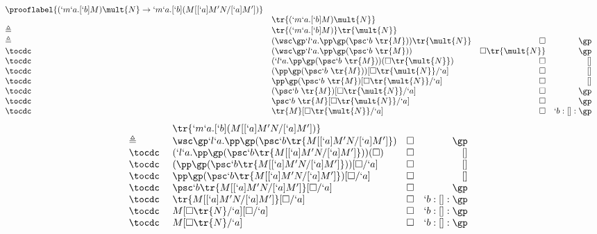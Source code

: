 \begin{Proof}
\[
\begin{array}{llrr}
  \prooflabel{(`m`a.[`b]M)\mult{N} \to `m`a.[`b](M[[`a]M'N/[`a]M'])} \\
             & \tr{(`m`a.[`b]M)\mult{N}} \\
  \triangleq & \tr{(`m`a.[`b]M)}\tr{\mult{N}} \\
  \triangleq & (\wsc \gp `l`a.\pp \gp (\psc `b\  \tr{M})) \tr{\mult{N}} & \square & \gp \\
  \tocdc\    & (\wsc \gp `l`a.\pp \gp (\psc `b\  \tr{M})) & \square \tr{\mult{N}} & \gp \\
  \tocdc\    & (`l`a.\pp \gp (\psc `b\ \tr{M}))(\square \tr{\mult{N}}) & \square & []   \\
  \tocdc\    & (\pp \gp (\psc `b\ \tr{M}))[\square \tr{\mult{N}}/`a]   & \square & []   \\
  \tocdc\    & \pp \gp (\psc `b\ \tr{M})[\square \tr{\mult{N}}/`a]     & \square & []   \\
  \tocdc\    & (\psc `b\ \tr{M})[\square \tr{\mult{N}}/`a]             & \square & \gp  \\
  \tocdc\    & \psc `b\ \tr{M}[\square \tr{\mult{N}}/`a]               & \square & \gp  \\
  \tocdc\    & \tr{M}[\square \tr{\mult{N}}/`a]                        & \square & `b:[]:\gp  \\
\end{array}
\]
\[
\begin{array}{llrr}
             & \tr{`m`a.[`b](M[[`a]M'N/[`a]M'])} \\
  \triangleq & \wsc \gp `l`a. \pp \gp (\psc `b \tr{M[[`a]M'N/[`a]M']})   & \square & \gp \\
  \tocdc\    & (`l`a. \pp \gp (\psc `b \tr{M[[`a]M'N/[`a]M']}))(\square) & \square & [] \\
  \tocdc\    & (\pp \gp (\psc `b \tr{M[[`a]M'N/[`a]M']}))[\square/`a]    & \square & [] \\
  \tocdc\    & \pp \gp (\psc `b \tr{M[[`a]M'N/[`a]M']})[\square/`a]      & \square & [] \\
  \tocdc\    & \psc `b \tr{M[[`a]M'N/[`a]M']}[\square/`a]                & \square & \gp \\
  \tocdc\    & \tr{M[[`a]M'N/[`a]M']}[\square/`a]                        & \square & `b:[]:\gp \\
  \tocdc\    & M[\square \tr{N}/`a][\square/`a]                          & \square & `b:[]:\gp \\
  \tocdc\    & M[\square \tr{N}/`a]                                      & \square & `b:[]:\gp \\

\end{array}\]
\end{Proof}
